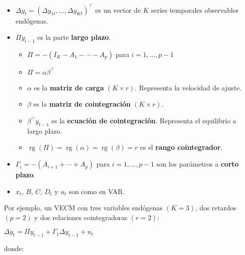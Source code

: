 \documentclass[10pt, a4paper, landscape]{article}
\DeclareMathOperator{\rk}{rg}
\begin{document}
\begin{multicols}{2}
\begin{itemize}[leftmargin=*]
	\item \( \Delta y_{t} = (\Delta y_{1t}, \ldots, \Delta y_{Kt})^{\top} \) es un vector de \( K \) series temporales observables endógenas.
	\item \( \Pi y_{t - 1} \) es la parte \textbf{largo plazo}.
	\begin{itemize}[leftmargin=*, label={\( \diamond \)}]
		\item \( \Pi = - (I_{K} - A_{1} - \cdots - A_{p}) \) para \( i = 1, \ldots, p - 1 \)
		\item \( \Pi = \alpha \beta^{\top} \)
		\item \( \alpha \) es la \textbf{matriz de carga} \( (K \times r) \). Representa la velocidad de ajuste.
		\item \( \beta \) es la \textbf{matriz de cointegración} \( (K \times r) \).
		\item \( \beta^{\top} y_{t - 1} \) es la \textbf{ecuación de cointegración}. Representa el equilibrio a largo plazo.
		\item \( \rk(\Pi) = \rk(\alpha) = \rk(\beta) = r \) es el \textbf{rango cointegrador}.
	\end{itemize}
	\item \( \Gamma_{i} = - (A_{i + 1} + \cdots + A_{p}) \) para \( i = 1, \ldots, p - 1 \) son los parámetros a \textbf{corto plazo}.
	\item \( x_{t} \), \( B \), \( C \), \( D_{t} \) y \( u_{t} \) son como en VAR.
\end{itemize}

Por ejemplo, un VECM con tres variables endógenas \( (K = 3) \), dos retardos \( (p = 2) \) y dos relaciones cointegradoras \( (r = 2) \):

\begin{center}
	\( \Delta y_{t} = \Pi y_{t - 1} + \Gamma_{1} \Delta y_{t - 1} + u_{t} \)
\end{center}

\quad donde:


\end{multicols}
\end{document}
